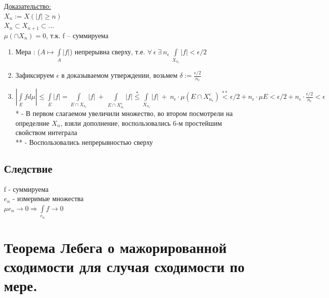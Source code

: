 \documentclass[paper=a4, fontsize=17pt]{article}
\begin{document}
\underline{Доказательство:} \\
$X_n := X(|f| \geq n)$\\
$X_n \subset X_{n+1} \subset ...$\\
$\mu(\cap X_n) = 0$, т.к. f -- суммируема
\begin{enumerate}
	\item Мера : ($A \mapsto \int\limits_{A}|f|$) непрерывна сверху, т.е.
	$\forall ~ \epsilon ~ \exists ~ n_{\epsilon} ~ \int\limits_{X_{n_{\epsilon}}}|f| < \epsilon / 2$
	\item Зафиксируем $\epsilon$ в доказываемом утверждении, возьмем $\delta := \frac{\epsilon / 2}{n_{\epsilon}}$
	\item $|\int\limits_{E}f d\mu| \leq \int\limits_{E} |f| = \int\limits_{E \cap X_{n_{\epsilon}}}|f| ~+~ \int\limits_{E \cap X_{n_{\epsilon}}^c}|f| \overset{*}{\leq} \int\limits_{X_{n_{\epsilon}}}|f| ~+~ n_{\epsilon} \cdot \mu (E \cap X_{n_{\epsilon}}^c) \overset{**}{<} \epsilon / 2 + n_\epsilon \cdot \mu E < \epsilon / 2 + n_\epsilon \cdot \frac{\epsilon / 2}{n_{\epsilon}} < \epsilon$ \\
	* - В первом слагаемом увеличили множество, во втором посмотрели на определние $X_n$, взяли дополнение, воспользовались 6-м простейшим свойством интеграла\\
	** - Воспользовались непрерывностью сверху
\end{enumerate}
	\subsection{Следствие}
	f - суммируема\\
	$e_n$ - измеримые множества\\
	
	$\mu e_n \rightarrow 0 \Rightarrow \int\limits_{e_n}f \rightarrow 0$
\section{Теорема Лебега о мажорированной сходимости для случая сходимости по мере.}
\end{document}
